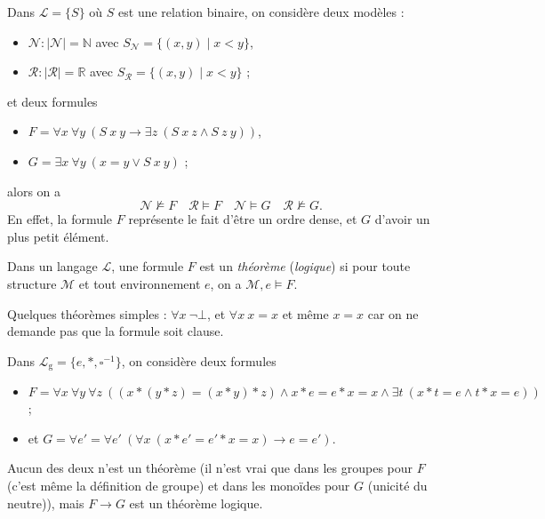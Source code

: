 \documentclass[./main]{subfiles}
\begin{document}
  \begin{exm}
    Dans $\mathcal{L} = \{S\}$ où $S$ est une relation binaire, on considère deux modèles :
    \begin{itemize}
      \item $\mathcal{N} : |\mathcal{N}| = \mathds{N}$ avec $S_\mathcal{N} = \{(x,y)  \mid x < y\}$,
      \item $\mathcal{R} : |\mathcal{R}| = \mathds{R}$ avec $S_\mathcal{R} = \{(x,y)  \mid x < y\}$ ;
    \end{itemize}
    et deux formules
    \begin{itemize}
      \item $F = \forall x \: \forall y \: (S\: x \: y \to \exists z\:(S \: x \: z \land S \: z \: y))$,
      \item $G = \exists x \: \forall y \: (x = y \lor S \: x \: y)$ ;
    \end{itemize}
    alors on a 
    \[
    \mathcal{N} \not\models F \quad \mathcal{R} \models F \quad \mathcal{N} \models G \quad \mathcal{R} \not\models G
    .\]
    En effet, la formule $F$ représente le fait d'être un ordre dense, et $G$ d'avoir un plus petit élément.
  \end{exm}

  \begin{defn}
    Dans un langage $\mathcal{L}$, une formule $F$ est un \textit{théorème} (\textit{logique}) si pour toute structure $\mathcal{M}$ et tout environnement $e$, on a $\mathcal{M}, e \models F$.
  \end{defn}

  \begin{exm}
    Quelques théorèmes simples :
    $\forall x \: \lnot \bot$, et $\forall x \: x = x$ et même $x = x$ car on ne demande pas que la formule soit clause.

    Dans $\mathcal{L}_\mathrm{g} = \{e, *, \square^{-1}\}$, on considère deux formules 
    \begin{itemize}
      \item $F = \forall x \: \forall y \: \forall z \: ((x * (y * z) = (x * y) * z) \land x * e = e * x = x \land \exists t \: (x * t = e \land t * x = e))$ ;
      \item et $G = \forall e' = \forall e'\: (\forall x\: (x * e' = e' * x = x) \to  e = e')$.
    \end{itemize}
    Aucun des deux n'est un théorème (il n'est vrai que dans les groupes pour $F$ (c'est même la définition de groupe) et dans les monoïdes pour $G$ (unicité du neutre)), mais $F \to G$ est un théorème logique.
  \end{exm}
\end{document}
